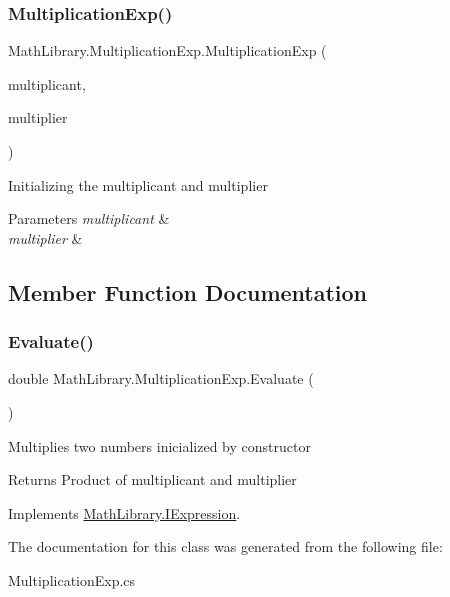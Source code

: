 \subsubsection{\texorpdfstring{MultiplicationExp()}{MultiplicationExp()}}
{\footnotesize\ttfamily Math\+Library.\+Multiplication\+Exp.\+Multiplication\+Exp (\begin{DoxyParamCaption}\item[{\mbox{\hyperlink{interface_math_library_1_1_i_expression}{I\+Expression}}}]{multiplicant,  }\item[{\mbox{\hyperlink{interface_math_library_1_1_i_expression}{I\+Expression}}}]{multiplier }\end{DoxyParamCaption})\hspace{0.3cm}{\ttfamily [inline]}}



Initializing the multiplicant and multiplier 


\begin{DoxyParams}{Parameters}
{\em multiplicant} & \\
\hline
{\em multiplier} & \\
\hline
\end{DoxyParams}


\subsection{Member Function Documentation}
\mbox{\label{class_math_library_1_1_multiplication_exp_a28b303e2c16035d0ca1e7eb57edeb262}} 
\subsubsection{\texorpdfstring{Evaluate()}{Evaluate()}}
{\footnotesize\ttfamily double Math\+Library.\+Multiplication\+Exp.\+Evaluate (\begin{DoxyParamCaption}{ }\end{DoxyParamCaption})\hspace{0.3cm}{\ttfamily [inline]}}



Multiplies two numbers inicialized by constructor 

\begin{DoxyReturn}{Returns}
Product of multiplicant and multiplier
\end{DoxyReturn}


Implements \mbox{\hyperlink{interface_math_library_1_1_i_expression}{Math\+Library.\+I\+Expression}}.



The documentation for this class was generated from the following file\+:\begin{DoxyCompactItemize}
\item 
Multiplication\+Exp.\+cs\end{DoxyCompactItemize}
